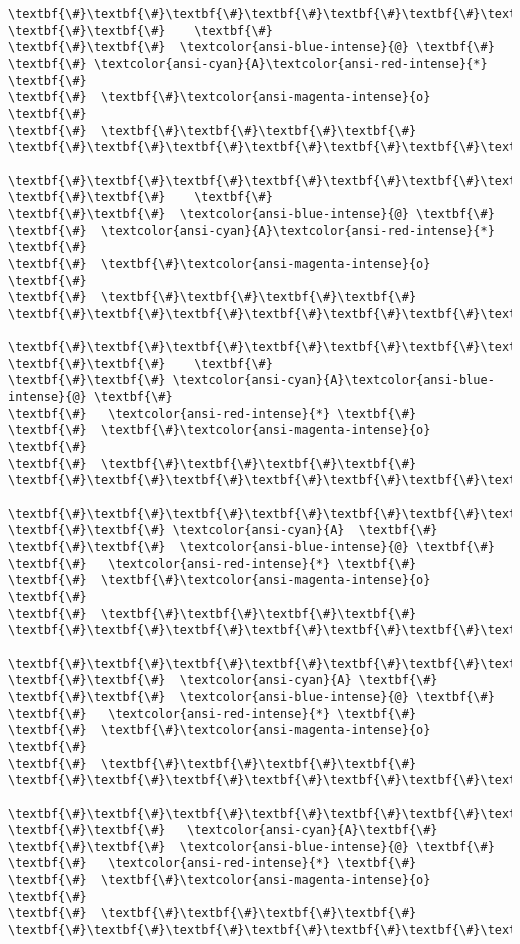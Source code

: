 \documentclass[11pt]{article}
\begin{document}
\begin{Verbatim}[commandchars=\\\{\}]
\textbf{\#}\textbf{\#}\textbf{\#}\textbf{\#}\textbf{\#}\textbf{\#}\textbf{\#}
\textbf{\#}\textbf{\#}    \textbf{\#}
\textbf{\#}\textbf{\#}  \textcolor{ansi-blue-intense}{@} \textbf{\#}
\textbf{\#} \textcolor{ansi-cyan}{A}\textcolor{ansi-red-intense}{*}  \textbf{\#}
\textbf{\#}  \textbf{\#}\textcolor{ansi-magenta-intense}{o} \textbf{\#}
\textbf{\#}  \textbf{\#}\textbf{\#}\textbf{\#}\textbf{\#}
\textbf{\#}\textbf{\#}\textbf{\#}\textbf{\#}\textbf{\#}\textbf{\#}\textbf{\#}

\textbf{\#}\textbf{\#}\textbf{\#}\textbf{\#}\textbf{\#}\textbf{\#}\textbf{\#}
\textbf{\#}\textbf{\#}    \textbf{\#}
\textbf{\#}\textbf{\#}  \textcolor{ansi-blue-intense}{@} \textbf{\#}
\textbf{\#}  \textcolor{ansi-cyan}{A}\textcolor{ansi-red-intense}{*} \textbf{\#}
\textbf{\#}  \textbf{\#}\textcolor{ansi-magenta-intense}{o} \textbf{\#}
\textbf{\#}  \textbf{\#}\textbf{\#}\textbf{\#}\textbf{\#}
\textbf{\#}\textbf{\#}\textbf{\#}\textbf{\#}\textbf{\#}\textbf{\#}\textbf{\#}

\textbf{\#}\textbf{\#}\textbf{\#}\textbf{\#}\textbf{\#}\textbf{\#}\textbf{\#}
\textbf{\#}\textbf{\#}    \textbf{\#}
\textbf{\#}\textbf{\#} \textcolor{ansi-cyan}{A}\textcolor{ansi-blue-intense}{@} \textbf{\#}
\textbf{\#}   \textcolor{ansi-red-intense}{*} \textbf{\#}
\textbf{\#}  \textbf{\#}\textcolor{ansi-magenta-intense}{o} \textbf{\#}
\textbf{\#}  \textbf{\#}\textbf{\#}\textbf{\#}\textbf{\#}
\textbf{\#}\textbf{\#}\textbf{\#}\textbf{\#}\textbf{\#}\textbf{\#}\textbf{\#}

\textbf{\#}\textbf{\#}\textbf{\#}\textbf{\#}\textbf{\#}\textbf{\#}\textbf{\#}
\textbf{\#}\textbf{\#} \textcolor{ansi-cyan}{A}  \textbf{\#}
\textbf{\#}\textbf{\#}  \textcolor{ansi-blue-intense}{@} \textbf{\#}
\textbf{\#}   \textcolor{ansi-red-intense}{*} \textbf{\#}
\textbf{\#}  \textbf{\#}\textcolor{ansi-magenta-intense}{o} \textbf{\#}
\textbf{\#}  \textbf{\#}\textbf{\#}\textbf{\#}\textbf{\#}
\textbf{\#}\textbf{\#}\textbf{\#}\textbf{\#}\textbf{\#}\textbf{\#}\textbf{\#}

\textbf{\#}\textbf{\#}\textbf{\#}\textbf{\#}\textbf{\#}\textbf{\#}\textbf{\#}
\textbf{\#}\textbf{\#}  \textcolor{ansi-cyan}{A} \textbf{\#}
\textbf{\#}\textbf{\#}  \textcolor{ansi-blue-intense}{@} \textbf{\#}
\textbf{\#}   \textcolor{ansi-red-intense}{*} \textbf{\#}
\textbf{\#}  \textbf{\#}\textcolor{ansi-magenta-intense}{o} \textbf{\#}
\textbf{\#}  \textbf{\#}\textbf{\#}\textbf{\#}\textbf{\#}
\textbf{\#}\textbf{\#}\textbf{\#}\textbf{\#}\textbf{\#}\textbf{\#}\textbf{\#}

\textbf{\#}\textbf{\#}\textbf{\#}\textbf{\#}\textbf{\#}\textbf{\#}\textbf{\#}
\textbf{\#}\textbf{\#}   \textcolor{ansi-cyan}{A}\textbf{\#}
\textbf{\#}\textbf{\#}  \textcolor{ansi-blue-intense}{@} \textbf{\#}
\textbf{\#}   \textcolor{ansi-red-intense}{*} \textbf{\#}
\textbf{\#}  \textbf{\#}\textcolor{ansi-magenta-intense}{o} \textbf{\#}
\textbf{\#}  \textbf{\#}\textbf{\#}\textbf{\#}\textbf{\#}
\textbf{\#}\textbf{\#}\textbf{\#}\textbf{\#}\textbf{\#}\textbf{\#}\textbf{\#}


\end{Verbatim}
\end{document}
